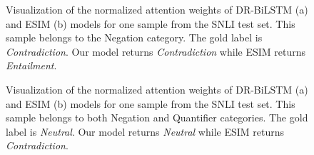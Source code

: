 \documentclass[11pt,a4paper]{article}
\begin{document}
	\begin{figure}[ht]
		\begin{center}
		\end{center}
		\caption{
			Visualization of the normalized attention weights of DR-BiLSTM (a) and ESIM (b) models for one sample from the SNLI test set. This sample belongs to the Negation category. The gold label is \emph{Contradiction}. Our model returns \emph{Contradiction} while ESIM returns \emph{Entailment}.
		}
		\label{fig:att:ana:cat2}
	\end{figure}
	
	
	\begin{figure}[ht]
		\begin{center}
		\end{center}
		\caption{
			Visualization of the normalized attention weights of DR-BiLSTM (a) and ESIM (b) models for one sample from the SNLI test set. This sample belongs to both Negation and Quantifier categories. The gold label is \emph{Neutral}. Our model returns \emph{Neutral} while ESIM returns \emph{Contradiction}.
		}
		\label{fig:att:ana:cat3}
	\end{figure}
	
\end{document}
